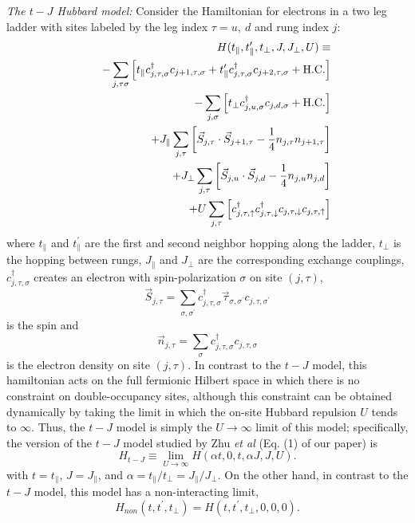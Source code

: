 \documentclass[aps,prb,twocolumn]{revtex4}
\def\be{\begin{equation}}       \def\ee{\end{equation}}
\def\bea{\begin{eqnarray}}      \def\eea{\end{eqnarray}}
\begin{document}
{\it The $t-J$ Hubbard model:}  Consider the Hamiltonian for electrons in a two leg ladder with %
 sites labeled by the
  leg index $\tau=u,\ d$ and rung index $j$:
\bea
&&H(t_\parallel,t_\parallel^\prime,t_\perp,J,J_\perp,U)\equiv \nonumber  \\
&&\ \ -\sum_{j,\tau \sigma}\left[t_\parallel c_{j,\tau,\sigma}^\dagger c_{j+1,\tau,\sigma} + t_\parallel^\prime c_{j,\tau,\sigma}^\dagger c_{j+2,\tau,\sigma} + {\rm H.C.}\right]\nonumber  \\
&&\ \ -\sum_{j,\sigma}\left[t_\perp c_{j,u,\sigma}^\dagger c_{j,d,\sigma} + {\rm H.C.}\right] \nonumber \\
&&\ \ + J_\parallel\sum_{j,\tau}\left[ \vec S_{j,\tau}\cdot \vec S_{j+1,\tau} -\frac 1 4 n_{j,\tau}n_{j+1,\tau}\right ]\nonumber \\
&&+J_\perp\sum_{j,\tau}\left[  \vec S_{j,u}\cdot\vec S_{j,d}-\frac 1 4 n_{j,u}n_{j,d} \right]  \nonumber \\
&&\ \ +U\sum_{j,\tau}\left[ c_{j,\tau,\uparrow}^\dagger  c_{j,\tau,\downarrow}^\dagger c_{j,\tau,\downarrow}c_{j,\tau,\uparrow}\right]
\label{H}
\eea 
where $t_\parallel$ and $t_\parallel^\prime$ are the first and second neighbor hopping along the ladder, $t_\perp$ is the hopping between rungs, $J_\parallel$ and $J_\perp$ are the corresponding exchange couplings, $c_{j,\tau,\sigma}^\dagger$ creates an electron with spin-polarization $\sigma$ on site $(j,\tau)$,  
\be
\vec S_{j,\tau} = \sum_{\sigma,\sigma^\prime} c_{j,\tau,\sigma}^\dagger \vec \tau_{\sigma,\sigma^\prime} c_{j,\tau,\sigma^\prime} 
\ee 
is the spin  and
\be
\vec n_{j,\tau} = \sum_{\sigma} c_{j,\tau,\sigma}^\dagger c_{j,\tau,\sigma} 
\ee 
is the electron density on site $(j,\tau)$.  In contrast to the $t-J$ model, this hamiltonian   acts on  the full fermionic Hilbert space in which there is no constraint on double-occupancy  sites, although this constraint can be obtained dynamically by taking the limit in which the  on-site Hubbard repulsion $U$ tends to $\infty$.
Thus, the $t-J$ model is simply the $U\to\infty$ limit of this model;  specifically, the version of the $t-J$ model studied by Zhu {\it et al} (Eq. (1) of our paper) is
\be
H_{t-J} \equiv \lim_{U\to\infty} H(\alpha t,0,t,\alpha J,J,U) .
\label{tJ}
\ee
with $t=t_\parallel$, $J=J_\parallel$, and $\alpha=t_\parallel/t_\perp=J_\parallel/J_\perp$.
On the other hand, in contrast to the $t-J$ model, this model has a non-interacting limit,
\be
\label{non}
H_{non}(t,t^\prime,t_\perp) = H(t,t^\prime,t_\perp,0,0,0).
\ee
\end{document}
